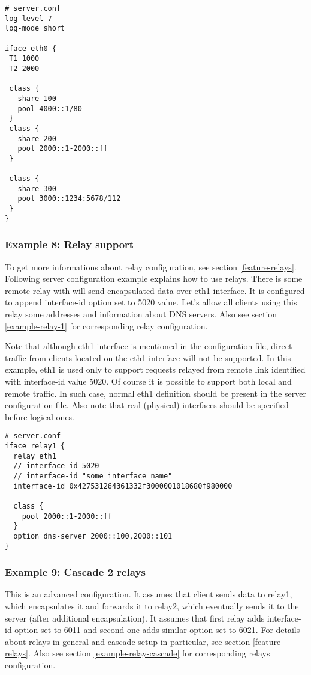 \begin{lstlisting}
# server.conf
log-level 7
log-mode short

iface eth0 {
 T1 1000
 T2 2000

 class {
   share 100
   pool 4000::1/80
 }
 class {
   share 200
   pool 2000::1-2000::ff
 }

 class {
   share 300
   pool 3000::1234:5678/112
 }
}
\end{lstlisting}

\subsubsection{Example 8: Relay support}
\label{example-server-relay1}
To get more informations about relay configuration, see section \ref{feature-relays}.
Following server configuration example explains how to use
relays. There is some remote relay with will send encapsulated data over
eth1 interface. It is configured to append interface-id option set to
5020 value. Let's allow all clients using this relay some addresses
and information about DNS servers. Also see section
\ref{example-relay-1} for corresponding relay configuration.

Note that although eth1 interface is mentioned in the configuration file,
direct traffic from clients located on the eth1 interface will not be
supported. In this example, eth1 is used only to support requests
relayed from remote link identified with interface-id value 5020.
Of course it is possible to support both local and remote traffic. In
such case, normal eth1 definition should be present in the server
configuration file. Also note that real (physical) interfaces should
be specified before logical ones.

\begin{lstlisting}
# server.conf
iface relay1 {
  relay eth1
  // interface-id 5020
  // interface-id "some interface name"
  interface-id 0x427531264361332f3000001018680f980000

  class {
    pool 2000::1-2000::ff
  }
  option dns-server 2000::100,2000::101
}
\end{lstlisting}

\subsubsection{Example 9: Cascade 2 relays}
\label{example-server-relay2}
This is an advanced configuration. It assumes that client sends data to
relay1, which encapsulates it and forwards it to relay2, which
eventually sends it to the server (after additional encapsulation). It
assumes that first relay adds interface-id option set to 6011 and
second one adds similar option set to 6021. For details about relays
in general and cascade setup in particular, see section
\ref{feature-relays}. Also see section \ref{example-relay-cascade}
for corresponding relays configuration.

